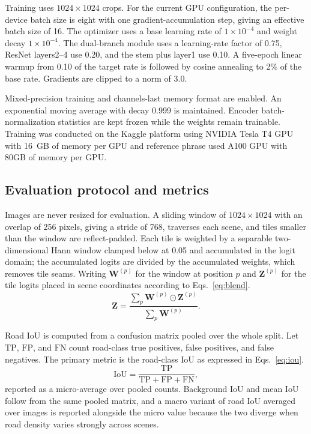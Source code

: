 \documentclass[a4paper,fleqn, review]{cas-sc}
\begin{document}
Training uses $1024\times1024$ crops. For the current GPU configuration,
the per-device batch size is eight with one gradient-accumulation step, giving
an effective batch size of 16. The optimizer uses a base learning rate of
$1\times10^{-4}$ and weight decay $1\times10^{-4}$. The dual-branch module
uses a learning-rate factor of 0.75, ResNet layers2--4 use 0.20, and the stem
plus layer1 use 0.10. A five-epoch linear warmup from 0.10 of the target rate
is followed by cosine annealing to 2\% of the base rate. Gradients are clipped
to a norm of 3.0.

Mixed-precision training and channels-last memory format are enabled. An
exponential moving average with decay 0.999 is maintained. Encoder batch-normalization statistics are
kept frozen while the weights remain trainable. Training was conducted on the Kaggle platform using NVIDIA Tesla T4 GPU
with 16~GB of memory per GPU and reference phrase used A100 GPU with 80GB of memory per GPU.

\subsection{Evaluation protocol and metrics}
\label{subsec:metrics}

Images are never resized for evaluation. A sliding window of $1024 \times 1024$
with an overlap of 256 pixels, giving a stride of 768, traverses each scene, and
tiles smaller than the window are reflect-padded. Each tile is weighted by a
separable two-dimensional Hann window clamped below at 0.05 and accumulated in
the logit domain; the accumulated logits are divided by the accumulated weights,
which removes tile seams. Writing $\mathbf{W}^{(p)}$ for the window at position
$p$ and $\mathbf{Z}^{(p)}$ for the tile logits placed in scene coordinates according to Eqs.~\eqref{eq:blend}.
%
\begin{equation}
\label{eq:blend}
\mathbf{Z} = \frac{\sum_p \mathbf{W}^{(p)} \odot \mathbf{Z}^{(p)}}
                  {\sum_p \mathbf{W}^{(p)}} .
\end{equation}

Road IoU is computed from a confusion matrix pooled over the whole split. Let
$\mathrm{TP}$, $\mathrm{FP}$, and $\mathrm{FN}$ count road-class true positives,
false positives, and false negatives. The primary metric is the road-class
IoU as expressed in Eqs.~\eqref{eq:iou}.
%
\begin{equation}
\label{eq:iou}
\mathrm{IoU} =
\frac{\mathrm{TP}}{\mathrm{TP} + \mathrm{FP} + \mathrm{FN}},
\end{equation}
%
reported as a micro-average over pooled counts. Background IoU and mean IoU
follow from the same pooled matrix, and a macro variant of road IoU averaged
over images is reported alongside the micro value because the two diverge
when road density varies strongly across scenes.
\end{document}
